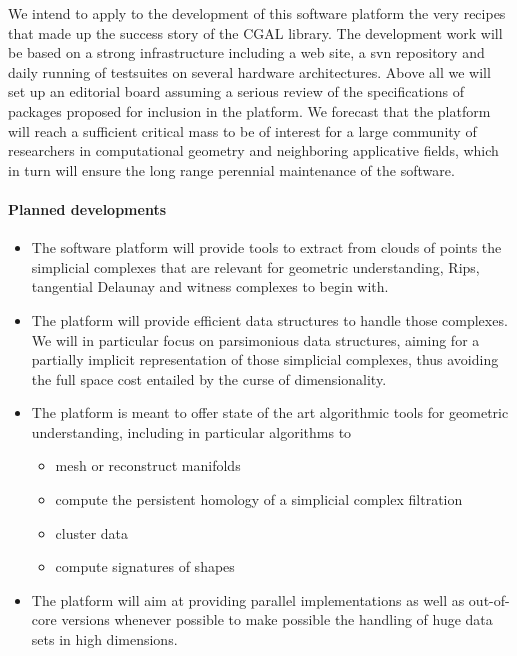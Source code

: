  We intend to apply to the development of this software platform 
the very  recipes that made up the success story
of the CGAL library. 
The development work will be based on a strong infrastructure
including a web site, a svn repository and  daily running of testsuites on several  hardware architectures.
Above all we will set up  an editorial board assuming a  serious review of the 
specifications of packages proposed for inclusion in the platform.
We forecast that the platform will reach a sufficient critical mass
to be of interest for a large community of researchers in
computational geometry and neighboring applicative fields,
which in turn will ensure the long range perennial maintenance
of the software.



\paragraph{Planned developments} 
\begin{itemize}
\item The software platform will provide tools to extract from clouds of points the
simplicial complexes that are relevant for geometric understanding,
Rips, tangential Delaunay  and witness complexes to begin with. 
\item The platform will provide efficient data structures to handle those
complexes. We will in particular  focus on parsimonious data
structures, aiming for a partially implicit representation of those simplicial
complexes, thus avoiding the full space cost entailed by the curse of
dimensionality. 
\item The platform is meant to offer state of the art algorithmic tools for geometric
understanding,
including in particular algorithms to
\begin{itemize}
\item  mesh or reconstruct manifolds
\item  compute the persistent homology of a simplicial complex filtration 
\item cluster data
\item compute signatures of shapes
\end{itemize}
\item The platform will aim at providing parallel implementations as well
as out-of-core versions whenever possible to make possible the
handling of huge data sets in high dimensions.
\end{itemize}


